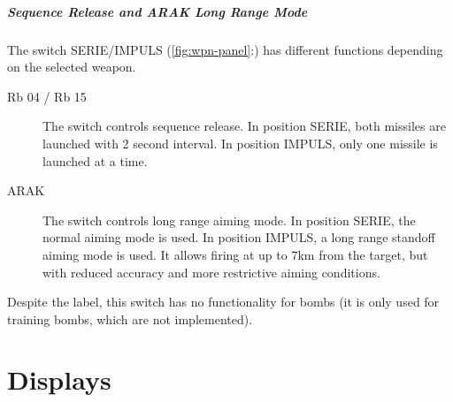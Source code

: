 \documentclass[a4paper]{report}
\newcommand{\figref}[2]{{\cref{#1}\hspace{0.1em}:\hspace{0.1em}\labelcref{#2}}}
\begin{document}
{\paragraph{Sequence Release and ARAK Long Range Mode}
The switch SERIE/IMPULS (\figref{fig:wpn-panel}{item:impuls})
has different functions depending on the selected weapon.
\begin{description}
  \item[Rb 04 / Rb 15] The switch controls sequence release.
    In position SERIE, both missiles are launched with 2 second interval.
    In position IMPULS, only one missile is launched at a time.
  \item[ARAK] The switch controls long range aiming mode.
    In position SERIE, the normal aiming mode is used.
    In position IMPULS, a long range standoff aiming mode is used.
    It allows firing at up to 7km from the target, but with reduced accuracy and more restrictive aiming conditions.
\end{description}
Despite the label, this switch has no functionality for bombs
(it is only used for training bombs, which are not implemented).
}



\chapter{Displays}



\end{document}
